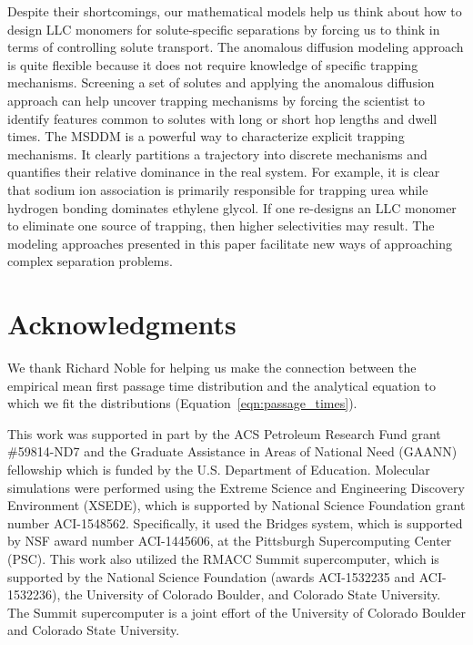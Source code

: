 \documentclass[journal=ancac3,manuscript=article,layout=twocolumn]{achemso}
\begin{document}
  Despite their shortcomings, our mathematical models help us think about how
  to design LLC monomers for solute-specific separations by forcing us to think
  in terms of controlling solute transport. The anomalous diffusion modeling
  approach is quite flexible because it does not require knowledge of specific
  trapping mechanisms. Screening a set of solutes and applying the anomalous
  diffusion approach can help uncover trapping mechanisms by forcing the
  scientist to identify features common to solutes with long or short hop
  lengths and dwell times. 
  The MSDDM is a powerful way to characterize explicit
  trapping mechanisms. It clearly partitions a trajectory into discrete
  mechanisms and quantifies their relative dominance in the real system. For
  example, it is clear that sodium ion association is primarily responsible for
  trapping urea while hydrogen bonding dominates ethylene glycol. If one
  re-designs an LLC monomer to eliminate one source of trapping, then 
  higher selectivities may result. The modeling approaches presented in this paper 
  facilitate new ways of approaching complex separation problems.
  
%

  \section*{Acknowledgments}
  
  We thank Richard Noble for helping us make the connection between the empirical 
  mean first passage time distribution and the analytical equation to which we fit
  the distributions (Equation~\ref{eqn:passage_times}).
  
  This work was supported in part by the ACS Petroleum Research Fund grant
  \#59814-ND7 and the Graduate Assistance in Areas of National Need (GAANN)
  fellowship which is funded by the U.S. Department of Education.  Molecular
  simulations were performed using the Extreme Science and Engineering
  Discovery Environment (XSEDE), which is supported by National Science
  Foundation grant number ACI-1548562. Specifically, it used the Bridges
  system, which is supported by NSF award number ACI-1445606, at the Pittsburgh
  Supercomputing Center (PSC). This work also utilized the RMACC Summit
  supercomputer, which is supported by the National Science Foundation (awards
  ACI-1532235 and ACI-1532236), the University of Colorado Boulder, and
  Colorado State University. The Summit supercomputer is a joint effort of the
  University of Colorado Boulder and Colorado State University.
  
\end{document}
